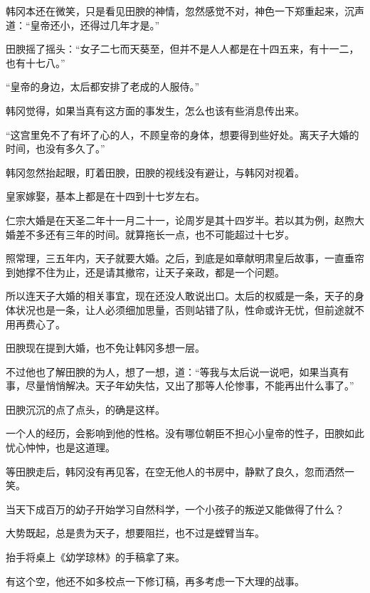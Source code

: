 韩冈本还在微笑，只是看见田腴的神情，忽然感觉不对，神色一下郑重起来，沉声道：“皇帝还小，还得过几年才是。”

田腴摇了摇头：“女子二七而天葵至，但并不是人人都是在十四五来，有十一二，也有十七八。”

“皇帝的身边，太后都安排了老成的人服侍。”

韩冈觉得，如果当真有这方面的事发生，怎么也该有些消息传出来。

“这宫里免不了有坏了心的人，不顾皇帝的身体，想要得到些好处。离天子大婚的时间，也没有多久了。”

韩冈忽然抬起眼，盯着田腴，田腴的视线没有避让，与韩冈对视着。

皇家嫁娶，基本上都是在十四到十七岁左右。

仁宗大婚是在天圣二年十一月二十一，论周岁是其十四岁半。若以其为例，赵煦大婚差不多还有三年的时间。就算拖长一点，也不可能超过十七岁。

照常理，三五年内，天子就要大婚。之后，到底是如章献明肃皇后故事，一直垂帘到她撑不住为止，还是请其撤帘，让天子亲政，都是一个问题。

所以连天子大婚的相关事宜，现在还没人敢说出口。太后的权威是一条，天子的身体状况也是一条，让人必须细加思量，否则站错了队，性命或许无忧，但前途就不用再费心了。

田腴现在提到大婚，也不免让韩冈多想一层。

不过他也了解田腴的为人，想了一想，道：“等我与太后说一说吧，如果当真有事，尽量悄悄解决。天子年幼失怙，又出了那等人伦惨事，不能再出什么事了。”

田腴沉沉的点了点头，的确是这样。

一个人的经历，会影响到他的性格。没有哪位朝臣不担心小皇帝的性子，田腴如此忧心忡忡，也是这道理。

等田腴走后，韩冈没有再见客，在空无他人的书房中，静默了良久，忽而洒然一笑。

当天下成百万的幼子开始学习自然科学，一个小孩子的叛逆又能做得了什么？

大势既起，总是贵为天子，想要阻拦，也不过是螳臂当车。

抬手将桌上《幼学琼林》的手稿拿了来。

有这个空，他还不如多校点一下修订稿，再多考虑一下大理的战事。
